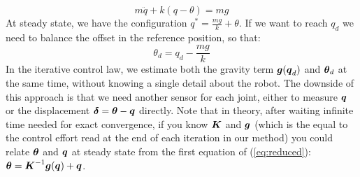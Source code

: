 \[
    m\ddot q + k(q-\theta) = mg
\]
At steady state, we have the configuration \(q^* = \frac{mg}{k} +\theta\). If we want to reach \(q_d\) we need to balance the offset in the reference position, so that:
\[
    \theta_d = q_d - \frac{mg}{k}
\]
In the iterative control law, we estimate both the gravity term \(\boldsymbol{g}({\boldsymbol{q}}_d)\) and \(\boldsymbol{\theta}_d\) at the same time, without knowing a single detail about the robot. The downside of this approach is that we need another sensor for each joint, either to measure \({\boldsymbol{q}}\) or the displacement \(\boldsymbol{\delta} = \boldsymbol{\theta} - {\boldsymbol{q}}\) directly. Note that in theory, after waiting infinite time needed for exact convergence, if you know $\boldsymbol{K}$ and $\boldsymbol{g}$ (which is the equal to the control effort read at the end of each iteration in our method) you could relate $\boldsymbol{\theta}$ and ${\boldsymbol{q}}$ at steady state from the first equation of (\ref{eq:reduced}): $\boldsymbol{\theta} = \boldsymbol{K}^{-1}\boldsymbol{g}({\boldsymbol{q}})+{\boldsymbol{q}}$. %
